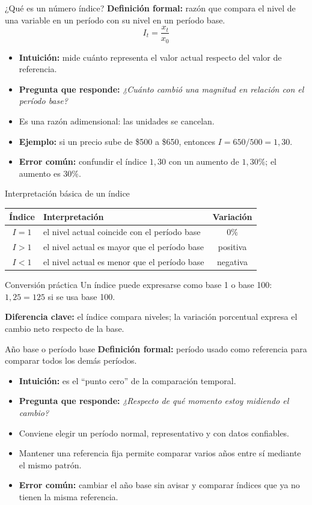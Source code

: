 \documentclass[aspectratio=169,11pt]{beamer}
\newcommand{\pregunta}[1]{\textbf{Pregunta que responde:} \emph{#1}}
\newcommand{\errorcomun}[1]{\textbf{Error común:} #1}
\newcommand{\diferencia}[1]{\textbf{Diferencia clave:} #1}
\newcommand{\intuicion}[1]{\textbf{Intuición:} #1}
\begin{document}
\begin{frame}{¿Qué es un número índice?}
\textbf{Definición formal:} razón que compara el nivel de una variable en un período con su nivel en un período base.
\[
I_t=\frac{x_t}{x_0}
\]
\begin{itemize}
  \item \intuicion{mide cuánto representa el valor actual respecto del valor de referencia.}
  \item \pregunta{¿Cuánto cambió una magnitud en relación con el período base?}
  \item Es una razón adimensional: las unidades se cancelan.
  \item \textbf{Ejemplo:} si un precio sube de \$500 a \$650, entonces $I=650/500=1{,}30$.
  \item \errorcomun{confundir el índice $1{,}30$ con un aumento de $1{,}30\%$; el aumento es $30\%$.}
\end{itemize}
\end{frame}

\begin{frame}{Interpretación básica de un índice}
\begin{center}
\begin{tabular}{c p{} c}
\toprule
Índice & Interpretación & Variación \\
\midrule
$I=1$ & el nivel actual coincide con el período base & $0\%$ \\
$I>1$ & el nivel actual es mayor que el período base & positiva \\
$I<1$ & el nivel actual es menor que el período base & negativa \\
\bottomrule
\end{tabular}
\end{center}
\begin{block}{Conversión práctica}
Un índice puede expresarse como base 1 o base 100: $1{,}25=125$ si se usa base 100.
\end{block}
\diferencia{el índice compara niveles; la variación porcentual expresa el cambio neto respecto de la base.}
\end{frame}

\begin{frame}{Año base o período base}
\textbf{Definición formal:} período usado como referencia para comparar todos los demás períodos.
\begin{itemize}
  \item \intuicion{es el ``punto cero'' de la comparación temporal.}
  \item \pregunta{¿Respecto de qué momento estoy midiendo el cambio?}
  \item Conviene elegir un período normal, representativo y con datos confiables.
  \item Mantener una referencia fija permite comparar varios años entre sí mediante el mismo patrón.
  \item \errorcomun{cambiar el año base sin avisar y comparar índices que ya no tienen la misma referencia.}
\end{itemize}
\end{frame}
\end{document}
